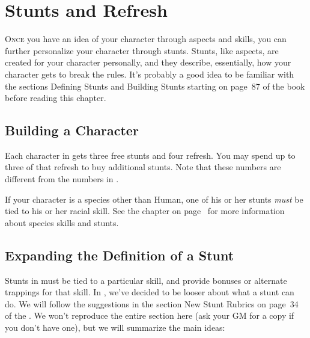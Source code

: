 \documentclass[12pt,titlepage,openany]{book}
\begin{document}
\chapter{Stunts and Refresh}\label{chap:stunts}

\lettrine[lines=1]{O}{nce} you have an idea of your character through aspects
and skills, you can further personalize your character through stunts. Stunts,
like aspects, are created for your character personally, and they describe,
essentially, how your character gets to break the rules. It's probably a good
idea to be familiar with the sections Defining Stunts and Building Stunts
starting on page~87 of the \FateCore{} book before reading this chapter.

\section{Building a Character}\label{sec:building}

Each character in \StarTrekFate{} gets three free stunts and four refresh. You
may spend up to three of that refresh to buy additional stunts. Note that these
numbers are different from the numbers in \FateCore{}.

If your character is a species other than Human, one of his or her stunts
\emph{must} be tied to his or her racial skill. See the 
chapter on page~\pageref{chap:species} for more information about species
skills and stunts.

\section{Expanding the Definition of a Stunt}\label{sec:aspect-stunts}

Stunts in \FateCore{} must be tied to a particular skill, and provide bonuses
or alternate trappings for that skill. In \StarTrekFate{}, we've decided to be
looser about what a stunt can do. We will follow the suggestions in the section
New Stunt Rubrics on page~34 of the \FateSystemToolkit{}. We won't reproduce
the entire section here (ask your GM for a copy if you don't have one), but we
will summarize the main ideas:
\end{document}
